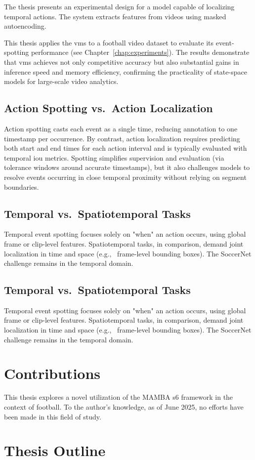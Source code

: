 The thesis presents an experimental design for a model capable of localizing temporal actions. The system extracts features from videos using masked autoencoding.

This thesis applies the \acrfull{vms} to a football video dataset to evaluate its event-spotting performance (see Chapter~\ref{chap:experiments}). The results demonstrate that \acrshort{vms} achieves not only competitive accuracy but also substantial gains in inference speed and memory efficiency, confirming the practicality of state-space models for large-scale video analytics. 

\subsection{Action Spotting vs.\ Action Localization}
Action spotting casts each event as a single time, reducing annotation to one timestamp per occurrence. By contrast, action localization requires predicting both start and end times for each action interval and is typically evaluated with temporal \acrfull{iou} metrics. Spotting simplifies supervision and evaluation (via tolerance windows around accurate timestamps), but it also challenges models to resolve events occurring in close temporal proximity without relying on segment boundaries.

\subsection{Temporal vs.\ Spatiotemporal Tasks}
Temporal event spotting focuses solely on "when" an action occurs, using global frame or clip-level features. Spatiotemporal tasks, in comparison, demand joint localization in time and space (e.g., \ frame-level bounding boxes). The SoccerNet challenge remains in the temporal domain.


\subsection{Temporal vs.\ Spatiotemporal Tasks}
Temporal event spotting focuses solely on "when" an action occurs, using global frame or clip-level features. Spatiotemporal tasks, in comparison, demand joint localization in time and space (e.g., \ frame-level bounding boxes). The SoccerNet challenge remains in the temporal domain.



\section{Contributions}

This thesis explores a novel utilization of the MAMBA \acrshort{s6} framework in the context of football. To the author's knowledge, as of June 2025, no efforts have been made in this field of study. 

\section{Thesis Outline}

